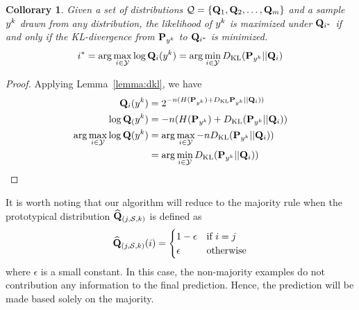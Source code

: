 \documentclass{article}
\newtheorem{collorary}[theorem]{Collorary}
\begin{document}
\begin{collorary}
\label{col:min_dkl}
Given a set of distributions $\mathcal{Q} = \{\mathbf{Q}_1,\mathbf{Q}_2, \ldots,
\mathbf{Q}_{m}\}$ and a sample $y^k$ drawn from any distribution, the
likelihood of $y^k$ is maximized under $\mathbf{Q}_{i^*}$ if and only if
the KL-divergence from $\mathbf{P}_{y^k}$ to $\mathbf{Q}_{i^*}$ is minimized.
\[
 i^* = \arg\max_{i \in \mathcal{Y}} \log \mathbf{Q}_i(y^k) = \arg\min_{i \in \mathcal{Y}} D_{\mathrm{KL}}(\mathbf{P}_{y^k}||\mathbf{Q}_i)
\]
\end{collorary}
\begin{proof}
  Applying Lemma~\ref{lemma:dkl}, we have
  \begin{align*}
    \mathbf{Q}_i(y^k) &= 2^{-n(H(\mathbf{P}_{y^k}) + D_{\mathrm{KL}}\mathbf{P}_{y^k} || \mathbf{Q}_i))}\\
    \log \mathbf{Q}_(y^k) &= -n(H(\mathbf{P}_{y^k}) + D_{\mathrm{KL}}(\mathbf{P}_{y^k} || \mathbf{Q}_i))\\
    \arg\max_{i \in \mathcal{Y}} \log \mathbf{Q}(y^k) &= \arg\max_{i \in \mathcal{Y}} - nD_{\mathrm{KL}}(\mathbf{P}_{y^k} || \mathbf{Q}_i))\\ 
    &= \arg\min_{i \in \mathcal{Y}} D_{\mathrm{KL}}(\mathbf{P}_{y^k} || \mathbf{Q}_i))\\
  \end{align*}
\end{proof}

\newcommand{\Qempjstar}{\widehat{\mathbf{Q}}_{(j^*,\trainset,k)}}

It is worth noting that our algorithm will reduce to the majority
rule when the prototypical distribution
$\widehat{\mathbf{Q}}_{(j,\mathcal{S},k)}$ is defined as 
\[
\widehat{\mathbf{Q}}_{(j,\mathcal{S},k)}(i) = \begin{cases} 1-\epsilon &\mbox{if } i = j \\ 
\epsilon & \mbox{otherwise} \end{cases}
\]
where $\epsilon$ is a small constant. In this case, the non-majority
examples do not contribution any information to the final
prediction. Hence, the prediction will be made based solely on the
majority.
\end{document}
